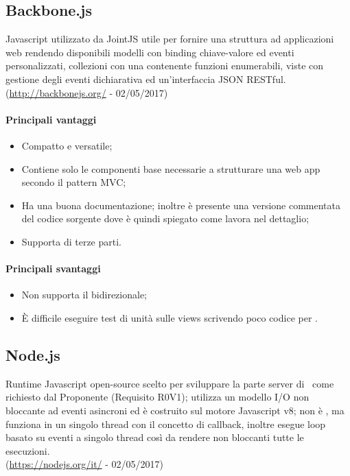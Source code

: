 \documentclass[../PianoDiQualifica.tex]{subfiles}
\begin{document}
		\subsection{Backbone.js}
			 Javascript utilizzato da JointJS utile per fornire una struttura ad applicazioni
			web rendendo disponibili modelli con binding chiave-valore ed eventi personalizzati,
			collezioni con una  contenente funzioni enumerabili, viste con gestione degli eventi
			dichiarativa ed un'interfaccia JSON RESTful.\\
			(\url{http://backbonejs.org/} - 02/05/2017)
			\paragraph{Principali vantaggi}
			\begin{itemize}
					\item Compatto e versatile;
					\item Contiene solo le componenti base necessarie a strutturare una web app
					secondo il pattern MVC;   %
					\item Ha una buona documentazione; inoltre è presente una versione commentata
					del codice sorgente dove è quindi spiegato come lavora nel dettaglio;
					\item Supporta  di terze parti.
				\end{itemize}
			\paragraph{Principali svantaggi}
				\begin{itemize}
					\item Non supporta il  bidirezionale;
					\item È difficile eseguire test di unità sulle views scrivendo poco codice per .
				\end{itemize}
		\subsection{Node.js}
			Runtime Javascript open-source scelto per sviluppare la parte server di \progetto\,
			come richiesto dal Proponente (Requisito R0V1); utilizza un modello I/O non bloccante
			ad eventi asincroni ed è costruito sul motore Javascript v8; non è , ma
			funziona in un singolo thread con il concetto di callback, inoltre esegue loop basato
			su eventi a singolo thread così da rendere non bloccanti tutte le esecuzioni.\\
			(\url{https://nodejs.org/it/} - 02/05/2017)
\end{document}
